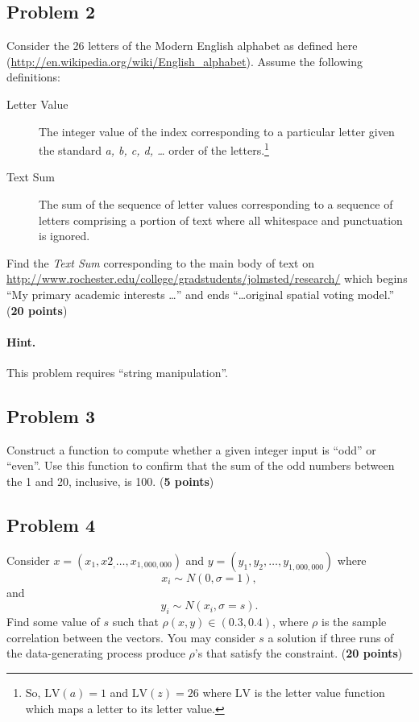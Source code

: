 \documentclass[10pt,letterpaper]{article}
\begin{document}
\subsection*{Problem 2}
Consider the 26 letters of the Modern English alphabet as defined here
(\url{http://en.wikipedia.org/wiki/English_alphabet}). Assume the
following definitions:
\begin{description}
\item [Letter Value] The integer value of the index corresponding to a
  particular letter given the standard \textit{a, b, c, d, \ldots}
  order of the letters.\footnote{So, $\textrm{LV}(a) = 1$ and
    $\textrm{LV}(z) = 26$ where $\textrm{LV}$ is the letter value
    function which maps a letter to its letter value.}

\item [Text Sum] The sum of the sequence of letter values
  corresponding to a sequence of letters comprising a portion of text
  where all whitespace and punctuation is ignored.
\end{description}

Find the \textit{Text Sum} corresponding to the main body of text on
\url{http://www.rochester.edu/college/gradstudents/jolmsted/research/}
which begins ``My primary academic interests \ldots'' and ends
``\ldots original spatial voting model.'' (\textbf{20 points})

\paragraph{Hint.} This problem requires ``string manipulation''.



\subsection*{Problem 3}

Construct a function to compute whether a given integer input is
``odd'' or ``even''. Use this function to confirm that the sum of the
odd numbers between the 1 and 20, inclusive, is 100. (\textbf{5
  points})



\subsection*{Problem 4}
Consider $x = (x_1, x2_, \ldots, x_{1,000,000})$ and $y = (y_1, y_2,
\ldots, y_{1,000,000})$ where
\[
x_i \sim N(0, \sigma = 1),
\]
and
\[
y_i \sim N(x_i, \sigma = s).
\]
Find some value of $s$ such that $\rho(x, y) \in (0.3, 0.4)$, where
$\rho$ is the sample correlation between the vectors. You may consider
$s$ a solution if three runs of the data-generating process produce
$\rho$'s that satisfy the constraint. (\textbf{20 points})
\end{document}
